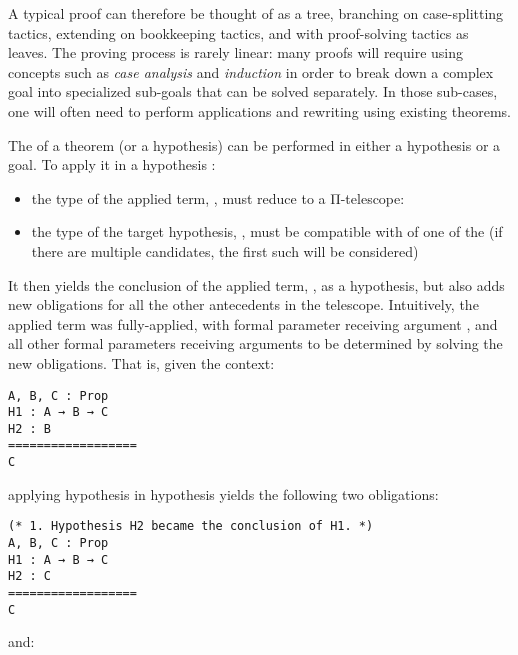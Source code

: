 A typical proof can therefore be thought of as a tree, branching on
case-splitting tactics, extending on bookkeeping tactics, and with proof-solving
tactics as leaves.  The proving process is rarely linear: many proofs will
require using concepts such as \emph{case analysis} and \emph{induction} in
order to break down a complex goal into specialized sub-goals that can be solved
separately.  In those sub-cases, one will often need to perform applications and
rewriting using existing theorems.

The  of a theorem (or a hypothesis)  can
be performed in either a hypothesis or a goal.  To apply it in a hypothesis
:

\begin{itemize}

  \item the type of the applied term, , must reduce to a Π-telescope:


  \item the type of the target hypothesis, , must be compatible
with of one of the  (if there are multiple candidates, the first
such  will be considered)

\end{itemize}

It then yields the conclusion of the applied term, , as a
hypothesis, but also adds new obligations for all the other antecedents in the
telescope.  Intuitively, the applied term  was fully-applied, with
formal parameter  receiving argument , and all other
formal parameters receiving arguments to be determined by solving the new
obligations.  That is, given the context:

\begin{verbatim}
A, B, C : Prop
H1 : A → B → C
H2 : B
==================
C
\end{verbatim}

\noindent applying hypothesis  in hypothesis  yields
the following two obligations:

\begin{verbatim}
(* 1. Hypothesis H2 became the conclusion of H1. *)
A, B, C : Prop
H1 : A → B → C
H2 : C
==================
C
\end{verbatim}

and:


